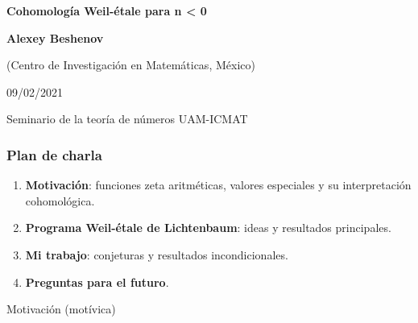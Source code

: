 \documentclass[handout]{beamer}
\begin{document}

\begin{frame}[noframenumbering]
  \begin{center}
    {\LARGE\bf Cohomología Weil-étale para n < 0

    }

    \vspace{3em}

    {\large\bf Alexey Beshenov}

    \vspace{1em}

    {\small (Centro de Investigación en Matemáticas, México)}

    \vspace{3em}

    09/02/2021

    \vspace{1em}

    Seminario de la teoría de números UAM-ICMAT

  \end{center}
\end{frame}


\begin{frame}
  \frametitle{Plan de charla}

  \begin{enumerate}
  \item \textbf{Motivación}:
    funciones zeta aritméticas,
    valores especiales
    y su interpretación cohomológica.

  \item \textbf{Programa Weil-étale de Lichtenbaum}:
    ideas y resultados principales.

  \item \textbf{Mi trabajo}:
    conjeturas y resultados incondicionales.

  \item \textbf{Preguntas para el futuro}.
  \end{enumerate}
\end{frame}


\begin{frame}[plain]
  \headingfont

  \begin{center}
    {\huge Motivación (motívica)}
  \end{center}
\end{frame}
\end{document}
